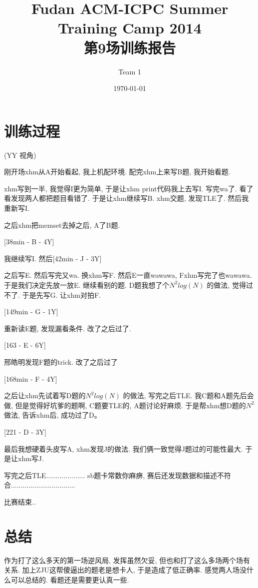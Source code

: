 \documentclass[a4paper, 11pt, nofonts, nocap, fancyhdr]{ctexart}
\title{Fudan ACM-ICPC Summer Training Camp 2014\\第9场训练报告}
\author{Team 1}
\date{\today}
\begin{document}
\maketitle

\section{训练过程}

(YY 视角)

刚开场xhm从A开始看起, 我上机配环境. 配完xhm上来写B题, 我开始看题.

xhm写到一半, 我觉得I更为简单, 于是让xhm print代码我上去写I. 写完wa了. 看了看发现两人都把题目看错了. 于是让xhm继续写B. xhm交题, 发现TLE了. 然后我重新写I. 

之后xhm把memset去掉之后, A了B题. 

[38min - B - 4Y]

我继续写I. 然后[42min - J - 3Y]

之后写E. 然后写完又wa. 换xhm写F. 然后E一直wawawa, Fxhm写完了也wawawa. 于是我们决定先放一放E. 继续看别的题. D题我想了个$N^2log(N)$ 的做法, 觉得过不了. 于是先写G. 让xhm对拍F.

[149min - G - 1Y]

重新读E题, 发现漏看条件. 改了之后过了. 

[163 - E - 6Y]

邢皓明发现F题的trick. 改了之后过了

[168min - F - 4Y]

之后让xhm先试着写D题的$N^2log(N)$ 的做法, 写完之后TLE. 我C题和A题先后会做, 但是觉得好坑爹的题啊, C题要TLE的, A题讨论好麻烦. 于是帮xhm想D题的$N^2$做法, 告诉xhm后, 成功过了D。

[221 - D - 3Y]

最后我想硬着头皮写A, xhm发现J的做法. 我们俩一致觉得J题过的可能性最大. 于是让xhm写J.

写完之后TLE.................... sb题卡常数你麻痹, 赛后还发现数据和描述不符合.................................

比赛结束..

\section{总结}

作为打了这么多天的第一场逆风局, 发挥虽然欠妥, 但也和打了这么多场两个场有关系. 加上ZJU这帮傻逼出的题老是想卡人, 于是造成了低正确率. 感觉两人场没什么可以总结的. 看题还是需要更认真一些.
\end{document}
